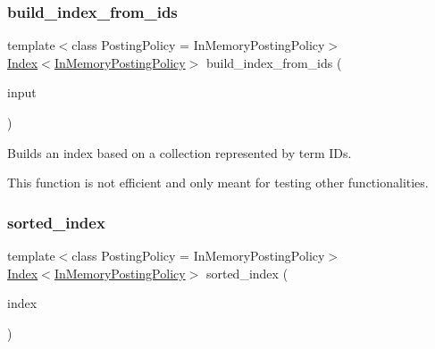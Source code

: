 \subsubsection{\texorpdfstring{build\+\_\+index\+\_\+from\+\_\+ids}{build\_index\_from\_ids}}
{\footnotesize\ttfamily template$<$class Posting\+Policy = In\+Memory\+Posting\+Policy$>$ \\
\mbox{\hyperlink{classbloodhound_1_1index_1_1Index}{Index}}$<$\mbox{\hyperlink{classbloodhound_1_1index_1_1InMemoryPostingPolicy}{In\+Memory\+Posting\+Policy}}$>$ build\+\_\+index\+\_\+from\+\_\+ids (\begin{DoxyParamCaption}\item[{const std\+::vector$<$ std\+::vector$<$ \mbox{\hyperlink{structbloodhound_1_1TermWeight}{Term\+Weight}} $>$$>$ \&}]{input }\end{DoxyParamCaption})\hspace{0.3cm}{\ttfamily [friend]}}

Builds an index based on a collection represented by term I\+Ds.

This function is not efficient and only meant for testing other functionalities. \mbox{\label{classbloodhound_1_1index_1_1Index_aad81f0929f0b03479f3361a23d96573b}} 
\subsubsection{\texorpdfstring{sorted\+\_\+index}{sorted\_index}}
{\footnotesize\ttfamily template$<$class Posting\+Policy = In\+Memory\+Posting\+Policy$>$ \\
\mbox{\hyperlink{classbloodhound_1_1index_1_1Index}{Index}}$<$\mbox{\hyperlink{classbloodhound_1_1index_1_1InMemoryPostingPolicy}{In\+Memory\+Posting\+Policy}}$>$ sorted\+\_\+index (\begin{DoxyParamCaption}\item[{const \mbox{\hyperlink{classbloodhound_1_1index_1_1Index}{Index}}$<$ \mbox{\hyperlink{classbloodhound_1_1index_1_1InMemoryPostingPolicy}{In\+Memory\+Posting\+Policy}} $>$ \&}]{index }\end{DoxyParamCaption})\hspace{0.3cm}{\ttfamily [friend]}}



